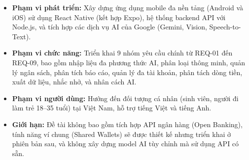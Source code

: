 \begin{itemize}
    \item \textbf{Phạm vi phát triển:} Xây dựng ứng dụng mobile đa nền tảng (Android và iOS) sử dụng React Native (kết hợp Expo), hệ thống backend API với Node.js, và tích hợp các dịch vụ AI của Google (Gemini, Vision, Speech-to-Text).
    \item \textbf{Phạm vi chức năng:} Triển khai 9 nhóm yêu cầu chính từ REQ-01 đến REQ-09, bao gồm nhập liệu đa phương thức AI, phân loại thông minh, quản lý ngân sách, phân tích báo cáo, quản lý đa tài khoản, phân tách dòng tiền, xuất dữ liệu, nhắc nhở, và nhân cách AI.
    \item \textbf{Phạm vi người dùng:} Hướng đến đối tượng cá nhân (sinh viên, người đi làm trẻ 18--35 tuổi) tại Việt Nam, hỗ trợ tiếng Việt và tiếng Anh.
    \item \textbf{Giới hạn:} Đề tài không bao gồm tích hợp API ngân hàng (Open Banking), tính năng ví chung (Shared Wallets) sẽ được thiết kế nhưng triển khai ở phiên bản sau, và không xây dựng model AI tùy chỉnh mà sử dụng API có sẵn.
\end{itemize}
